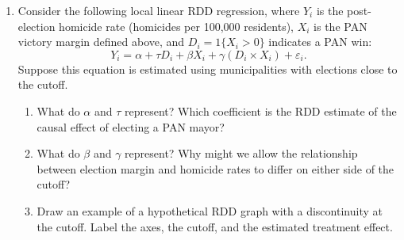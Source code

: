\documentclass[12pt]{article}
\begin{document}
\begin{enumerate}
\item Consider the following local linear RDD regression, where $Y_i$ is the post-election homicide rate (homicides per 100,000 residents), $X_i$ is the PAN victory margin defined above, and $D_i=1\{X_i>0\}$ indicates a PAN win:
\[
Y_i=\alpha+\tau D_i+\beta X_i+\gamma(D_i\times X_i)+\varepsilon_i.
\]
Suppose this equation is estimated using municipalities with elections close to the cutoff.
\begin{enumerate}
\item What do $\alpha$ and $\tau$ represent? Which coefficient is the RDD estimate of the causal effect of electing a PAN mayor?
\vspace{1.8cm}
\item What do $\beta$ and $\gamma$ represent? Why might we allow the relationship between election margin and homicide rates to differ on either side of the cutoff?
\vspace{1.8cm}
\item Draw an example of a hypothetical RDD graph with a discontinuity at the cutoff. Label the axes, the cutoff, and the estimated treatment effect.
\vspace{1.8cm}
\end{enumerate}
\vspace{8ex}


\end{enumerate}
\end{document}
